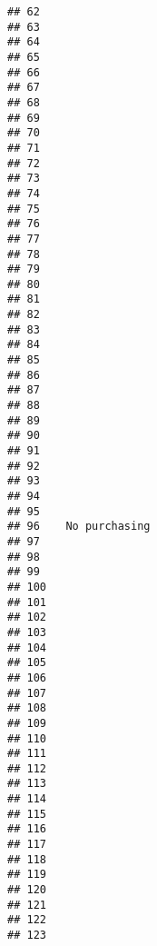 \documentclass[
]{article}
\begin{document}
\begin{verbatim}
## 62                                    
## 63                                    
## 64                                    
## 65                                    
## 66                                    
## 67                                    
## 68                                    
## 69                                    
## 70                                    
## 71                                    
## 72                                    
## 73                                    
## 74                                    
## 75                                    
## 76                                    
## 77                                    
## 78                                    
## 79                                    
## 80                                    
## 81                                    
## 82                                    
## 83                                    
## 84                                    
## 85                                    
## 86                                    
## 87                                    
## 88                                    
## 89                                    
## 90                                    
## 91                                    
## 92                                    
## 93                                    
## 94                                    
## 95                                    
## 96    No purchasing                   
## 97                                    
## 98                                    
## 99                                    
## 100                                   
## 101                                   
## 102                                   
## 103                                   
## 104                                   
## 105                                   
## 106                                   
## 107                                   
## 108                                   
## 109                                   
## 110                                   
## 111                                   
## 112                                   
## 113                                   
## 114                                   
## 115                                   
## 116                                   
## 117                                   
## 118                                   
## 119                                   
## 120                                   
## 121                                   
## 122                                   
## 123                                   

\end{verbatim}
\end{document}
